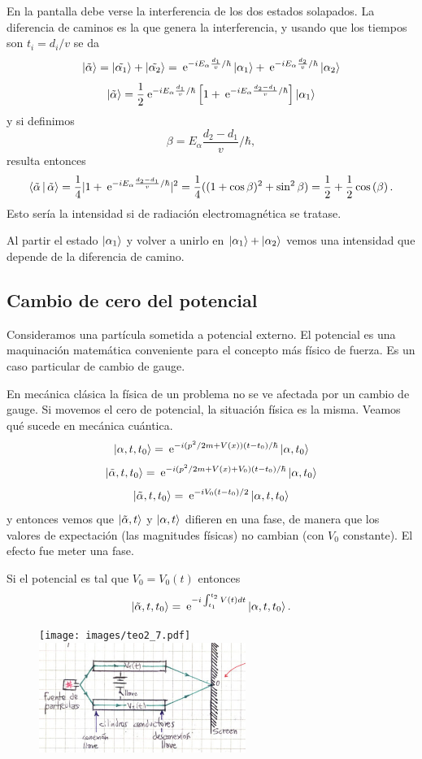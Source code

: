 \documentclass[10pt,oneside]{CBFT_book}
\begin{document}
En la pantalla debe verse la interferencia de los dos estados solapados. La diferencia de caminos
es la que genera la interferencia, y usando que los tiempos son $t_i = d_i/v$ se da
\[
	\Ket{\tilde{\alpha}} = \Ket{\tilde{\alpha_1}} + \Ket{\tilde{\alpha_2}} =
		\:\mathrm{e}^{ -i E_\alpha \frac{d_1}{v} /\hbar } \Ket{\alpha_1} +
		\:\mathrm{e}^{ -i E_\alpha \frac{d_2}{v} /\hbar } \Ket{\alpha_2}	
\]
\[
	\Ket{\tilde{\alpha}} = \frac{1}{2} \:\mathrm{e}^{ -i E_\alpha \frac{d_1}{v} /\hbar } 
		\left[ 1 + \:\mathrm{e}^{ -i E_\alpha \frac{d_2-d_1}{v} /\hbar } \right] \Ket{\alpha_1}
\]
y si definimos
\[
	\beta=E_\alpha \frac{d_2-d_1}{v} /\hbar,
\]
resulta entonces
\[
	\Braket{\tilde{\alpha}|\tilde{\alpha}} = 
	\frac{1}{4}| 1 +  \:\mathrm{e}^{ -i E_\alpha \frac{d_2-d_1}{v} /\hbar } |^2 =
		\frac{1}{4}( (1+\cos\beta)^2 + \sin^2\beta ) =
			\frac{1}{2} + \frac{1}{2}\cos\left( \beta \right).
\]
Esto sería la intensidad si de radiación electromagnética se tratase.

Al partir el estado $\Ket{\alpha_1} $ y volver a unirlo en $\Ket{\alpha_1} + \Ket{\alpha_2}$ vemos una 
intensidad que depende de la diferencia de camino.

\subsection{Cambio de cero del potencial}

Consideramos una partícula sometida a potencial externo.
El potencial es una maquinación matemática conveniente para el concepto más físico de fuerza.
Es un caso particular de cambio de gauge.


En mecánica clásica la física de un problema no se ve afectada por un cambio de gauge.
Si movemos el cero de potencial, la situación física es la misma.
Veamos qué sucede en mecánica cuántica.
\[
	\Ket{\alpha,t,t_0} = \:\mathrm{e}^{ -i (p^2/2m + V(x))(t-t_0)/\hbar} \Ket{\alpha,t_0}
\]
\[
	\Ket{\tilde{\alpha},t,t_0} = \:\mathrm{e}^{ -i (p^2/2m + V(x) + V_0)(t-t_0)/\hbar} \Ket{\alpha,t_0}
\]
\[
	\Ket{\tilde{\alpha},t,t_0} = \:\mathrm{e}^{ -i V_0(t-t_0)/2 }\Ket{\alpha,t,t_0}
\]
y entonces vemos que $\Ket{\tilde{\alpha},t}$ y $\Ket{\alpha,t}$ difieren en una fase, de manera que los 
valores de expectación (las magnitudes físicas) no cambian (con $V_0$ constante).
El efecto fue meter una fase.

Si el potencial es tal que $V_0 = V_0(t)$ entonces
\[
	\Ket{\tilde{\alpha},t,t_0} = \:\mathrm{e}^{ -i \int_{t_1}^{t_2} V(t) dt } \Ket{\alpha,t,t_0}.
\]


\begin{figure}[htb]
	\begin{center}
	\texttt{[image: images/teo2\_7.pdf]}
	\includegraphics[width=0.6\textwidth]{images/fig_ft2_cero_potential.jpg}
	\end{center}
	\caption{}
\end{figure} 
\end{document}
